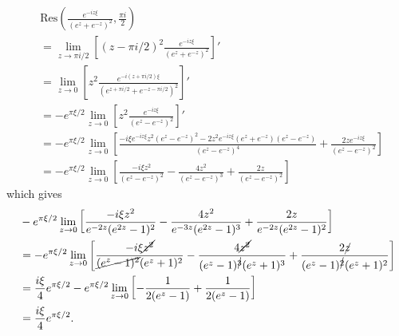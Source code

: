 \documentclass[12pt,reqno]{amsart}
\numberwithin{equation}{section}  %
\begin{document}
        \begin{equation*}
        \begin{split}
         & \text{Res} \left( \frac{e^{-iz \xi}}{(e^{z} + e^{-z})^{2}}, \frac{\pi i}{2} 
        \right)
        \\
        & = \lim_{z \to \pi i/2} \left[ (z - \pi i /2 )^{2} \frac{e^{-iz
        \xi}}{(e^{z} + e^{-z})^{2}} \right]'
        \\
        & = \lim_{z \to 0} \left[ z^{2} \frac{e^{-i(z + \pi i /2)
        \xi}}{(e^{z + \pi i/2} + e^{-z - \pi i /2})^{2}} \right]'
        \\
        & = -  e^{ \pi \xi/2} \lim_{z \to 0} \left[ z^{2}
        \frac{e^{-i z\xi}}{(e^{z} - e^{-z })^{2}} \right]'
        \\
        & = - e^{ \pi \xi/2} \lim_{z \to 0} \left[ 
        \frac{ - i \xi e^{-iz \xi} z^{2} (e^{z} - e^{-z})^{2} - 2z^{2} e^{-iz
        \xi}(e^{z} + e^{-z})(e^{z} - e^{-z})}{(e^{z} - e^{-z})^{4}} +
        \frac{2z e^{-i z \xi}}{(e^{z} - e^{-z})^{2}}
        \right ]
        \\
        &  = - e^{ \pi \xi/2} \lim_{z \to 0} \left[ \frac{ - i \xi
        z^{2}}{(e^{z} - e^{-z})^{2}} - \frac{4z^{2}}{(e^{z} - e^{-z})^{3}} +
        \frac{2z}{(e^{z} - e^{-z})^{2}}
        \right ]
      \end{split}
        \end{equation*}
        which gives
        \begin{equation*}
        \begin{split}
        & - e^{ \pi \xi/2} \lim_{z \to 0} \left[ \frac{ - i \xi
        z^{2}}{e^{-2z}(e^{2z} - 1)^{2}} - \frac{4z^{2}}{e^{-3z}(e^{2z} - 1)^{3}} +
        \frac{2z}{e^{-2z}(e^{2z} - 1)^{2}}
        \right ]
        \\
        & = - e^{ \pi \xi/2} \lim_{z \to 0} \left[ \frac{ - i \xi
        \cancel{z^{2}}}{\cancel{(e^{z} - 1)^{2}}(e^{z} + 1)^{2}}
        - \frac{4 \cancel{z^{2}}}{(e^{z} -
        1)^{\cancel{3}}(e^{z} + 1)^{3}} +
        \frac{2\cancel{z}}{(e^{z} - 1)^{\cancel{2}}(e^{z}+1)^{2}}
        \right ]
        \\
        & = \frac{i \xi}{4} e^{\pi \xi /2}
        - e^{ \pi \xi/2} \lim_{z \to 0} \left[ -\frac{1}{2(e^{z} -1)} +
        \frac{1}{2(e^{z}-1)} \right]
        \\
        & = \frac{i \xi}{4} e^{\pi \xi /2}.
        \end{split}
        \end{equation*}
\end{document}
